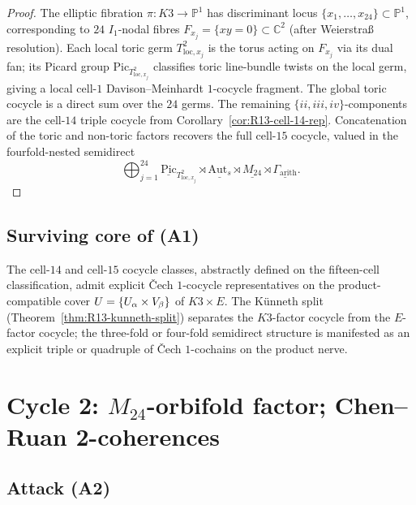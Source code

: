 \documentclass[11pt]{amsart}
\providecommand{\C}{\mathbb{C}}
\providecommand{\Aut}{\mathrm{Aut}}
\providecommand{\Pic}{\mathrm{Pic}}
\begin{document}
\begin{proof}
The elliptic fibration $\pi: K3 \to \mathbb{P}^1$ has discriminant
locus $\{x_1, \ldots, x_{24}\} \subset \mathbb{P}^1$, corresponding
to $24$ $I_1$-nodal fibres $F_{x_j} = \{xy = 0\} \subset \C^2$ (after
Weierstra\ss{} resolution). Each local toric germ $T^2_{\mathrm{loc}, x_j}$
is the torus acting on $F_{x_j}$ via its dual fan; its Picard group
$\Pic_{T^2_{\mathrm{loc}, x_j}}$ classifies toric line-bundle twists
on the local germ, giving a local cell-$1$ Davison--Meinhardt
$1$-cocycle fragment. The global toric cocycle is a direct sum over
the $24$ germs. The remaining $\{ii, iii, iv\}$-components are the
cell-$14$ triple cocycle from Corollary~\ref{cor:R13-cell-14-rep}.
Concatenation of the toric and non-toric factors recovers the full
cell-$15$ cocycle, valued in the fourfold-nested semidirect
\[
  \bigoplus_{j=1}^{24} \underline{\Pic}_{T^2_{\mathrm{loc}, x_j}}
  \rtimes \underline{\Aut_s} \rtimes \underline{M_{24}} \rtimes
  \underline{\Gamma_{\mathrm{arith}}}.
\]
\end{proof}

\subsection*{Surviving core of (A1)}

The cell-$14$ and cell-$15$ cocycle classes, abstractly defined on the
fifteen-cell classification, admit explicit \v{C}ech $1$-cocycle
representatives on the product-compatible cover
$U = \{U_\alpha \times V_\beta\}$ of $K3 \times E$. The K\"{u}nneth
split (Theorem~\ref{thm:R13-kunneth-split}) separates the $K3$-factor
cocycle from the $E$-factor cocycle; the three-fold or four-fold
semidirect structure is manifested as an explicit triple or quadruple
of \v{C}ech $1$-cochains on the product nerve.

\section{Cycle 2: $M_{24}$-orbifold factor; Chen--Ruan 2-coherences}

\subsection*{Attack (A2)}
\end{document}
